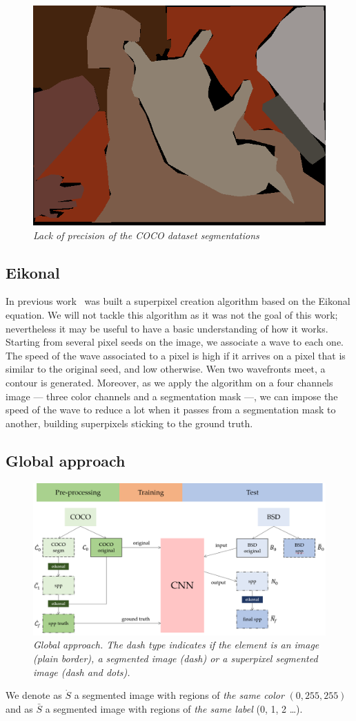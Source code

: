 \documentclass{article}
\begin{document}
        \begin{figure}[!ht]
            \centering
            \includegraphics[width=0.3\linewidth]{pics/img_segm_coco.png}
            \caption{\textit{Lack of precision of the COCO dataset segmentations}}
            \label{fig:imprecise}
        \end{figure}


    \subsection{Eikonal}
        In previous work~\cite{figliuzzi2019} was built a superpixel creation algorithm based on the Eikonal equation. We will not tackle this algorithm as it was not the goal of this work; nevertheless it may be useful to have a basic understanding of how it works. Starting from several pixel seeds on the image, we associate a wave to each one. The speed of the wave associated to a pixel is high if it arrives on a pixel that is similar to the original seed, and low otherwise. Wen two wavefronts meet, a contour is generated. Moreover, as we apply the algorithm on a four channels image --- three color channels and a segmentation mask ---, we can impose the speed of the wave to reduce a lot when it passes from a segmentation mask to another, building superpixels sticking to the ground truth.

    \subsection{Global approach}
        \begin{figure}[!ht]
            \centering
            \includegraphics[width=\linewidth]{pics/schema-global.png}
            \caption{\textit{Global approach. The dash type indicates if the element is an image (plain border), a segmented image (dash) or a superpixel segmented image (dash and dots).}}
        \end{figure}
        \par
        We denote as $\dot S$ a segmented image with regions of \textit{the same color} $(0, 255, 255)$  and as $\bar S$ a segmented image with regions of \textit{the same label} (0, 1, 2 \dots).
\end{document}
